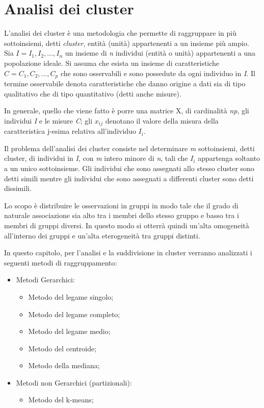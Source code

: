 \chapter{Analisi dei cluster}\label{cap5}

L'analisi dei cluster è una metodologia che permette di raggruppare in più sottoinsiemi, detti \textit{cluster}, entità (unità) appartenenti a un insieme più ampio. Sia $I = I_1, I_2, ..., I_n$ un insieme di \textit{n} individui (entità o unità) appartenenti a una popolazione ideale. Si assuma che esista un insieme di caratteristiche $C = C_1, C_2, ..., C_p$ che sono osservabili e sono possedute da ogni individuo in \textit{I}. Il termine osservabile denota caratteristiche che danno origine a dati sia di tipo qualitativo che di tipo quantitativo (detti anche misure).

In generale, quello che viene fatto è porre una matrice X, di cardinalità \textit{np}, gli individui \textit{I} e le misure \textit{C}; gli $x_{ij}$ denotano il valore della misura della caratteristica j-esima relativa all'individuo $I_i$.

Il problema dell'analisi dei cluster consiste nel determinare \textit{m} sottoinsiemi, detti cluster, di individui in \textit{I}, con \textit{m} intero minore di \textit{n}, tali che $I_i$ appartenga soltanto a un unico sottoinsieme. Gli individui che sono assegnati allo stesso cluster sono detti simili mentre gli individui che sono assegnati a differenti cluster sono detti dissimili.

Lo scopo è distribuire le osservazioni in gruppi in modo tale che il grado di naturale associazione sia alto tra i membri dello stesso gruppo e basso tra i membri di gruppi diversi. In questo modo si otterrà quindi un'alta omogeneità all'interno dei gruppi e un'alta eterogeneità tra gruppi distinti.

In questo capitolo, per l'analisi e la suddivisione in cluster verranno analizzati i seguenti metodi di raggruppamento:

\begin{itemize}
    \item Metodi Gerarchici:
    \begin{itemize}
        \item Metodo del legame singolo;
        \item Metodo del legame completo;
        \item Metodo del legame medio;
        \item Metodo del centroide;
        \item Metodo della mediana;
    \end{itemize}
    \item Metodi non Gerarchici (partizionali):
    \begin{itemize}
        \item Metodo del k-means;
    \end{itemize}
\end{itemize}

